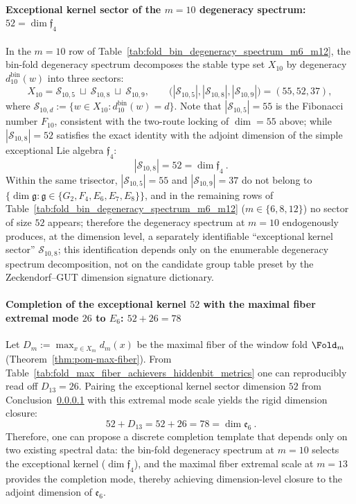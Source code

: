 \label{subsec:bdry-tower-zeck-gut-part2}
\paragraph{Exceptional kernel sector of the \(m=10\) degeneracy spectrum: \texorpdfstring{$52=\dim\mathfrak{f}_4$}{52=dim f4}}\label{par:gut-exceptional-kernel-f4}
In the \(m=10\) row of Table~\ref{tab:fold_bin_degeneracy_spectrum_m6_m12},
the bin-fold degeneracy spectrum decomposes the stable type set \(X_{10}\) by degeneracy \(d^{\mathrm{bin}}_{10}(w)\) into three sectors:
\[
X_{10}=\mathcal{S}_{10,5}\ \sqcup\ \mathcal{S}_{10,8}\ \sqcup\ \mathcal{S}_{10,9},\qquad
\bigl(|\mathcal{S}_{10,5}|,|\mathcal{S}_{10,8}|,|\mathcal{S}_{10,9}|\bigr)=(55,52,37),
\]
where \(\mathcal{S}_{10,d}:=\{w\in X_{10}: d^{\mathrm{bin}}_{10}(w)=d\}\).
Note that \(|\mathcal{S}_{10,5}|=55\) is the Fibonacci number \(F_{10}\), consistent with the two-route locking of \(\dim=55\) above;
while \(|\mathcal{S}_{10,8}|=52\) satisfies the exact identity with the adjoint dimension of the simple exceptional Lie algebra \(\mathfrak{f}_4\):
\[
\boxed{\ |\mathcal{S}_{10,8}|=52=\dim\mathfrak{f}_4\ }.
\]
Within the same trisector, \(|\mathcal{S}_{10,5}|=55\) and \(|\mathcal{S}_{10,9}|=37\) do not belong to
\(\{\dim\mathfrak{g}:\mathfrak{g}\in\{G_2,F_4,E_6,E_7,E_8\}\}\),
and in the remaining rows of Table~\ref{tab:fold_bin_degeneracy_spectrum_m6_m12} (\(m\in\{6,8,12\}\)) no sector of size \(52\) appears;
therefore the degeneracy spectrum at \(m=10\) endogenously produces, at the dimension level, a separately identifiable ``exceptional kernel sector'' \(\mathcal{S}_{10,8}\);
this identification depends only on the enumerable degeneracy spectrum decomposition, not on the candidate group table preset by the Zeckendorf--GUT dimension signature dictionary.

\paragraph{Completion of the exceptional kernel \texorpdfstring{$52$}{52} with the maximal fiber extremal mode \texorpdfstring{$26$}{26} to \texorpdfstring{$E_6$}{E6}: \texorpdfstring{$52+26=78$}{52+26=78}}\label{par:gut-e6-completion-52-26}
Let \(D_m:=\max_{x\in X_m} d_m(x)\) be the maximal fiber of the window fold \(\Fold_m\) (Theorem~\ref{thm:pom-max-fiber}).
From Table~\ref{tab:fold_max_fiber_achievers_hiddenbit_metrics} one can reproducibly read off
\(
D_{13}=26
\).
Pairing the exceptional kernel sector dimension \(52\) from Conclusion~\ref{par:gut-exceptional-kernel-f4} with this extremal mode scale yields the rigid dimension closure:
\[
\boxed{\ 52+D_{13}=52+26=78=\dim\mathfrak{e}_6\ }.
\]
Therefore, one can propose a discrete completion template that depends only on two existing spectral data: the bin-fold degeneracy spectrum at \(m=10\) selects the exceptional kernel (\(\dim\mathfrak{f}_4\)), and the maximal fiber extremal scale at \(m=13\) provides the completion mode, thereby achieving dimension-level closure to the adjoint dimension of \(\mathfrak{e}_6\).

